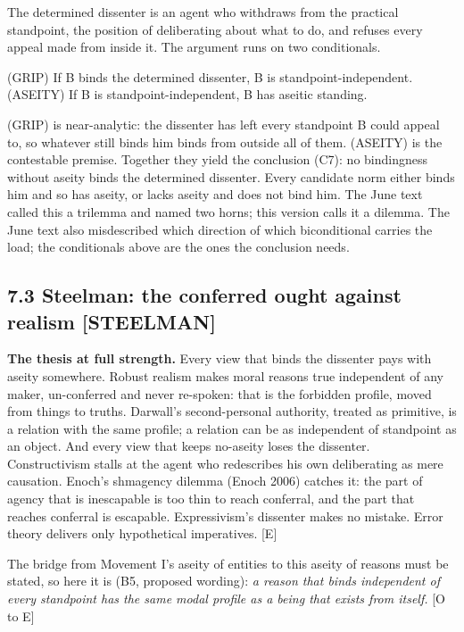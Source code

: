 \documentclass[11pt]{article}
\newcommand{\register}[1]{{\ttfamily\small #1}}
\begin{document}
The determined dissenter is an agent who withdraws from the practical standpoint, the position of deliberating about what to do, and refuses every appeal made from inside it. The argument runs on two conditionals.

(GRIP)    If B binds the determined dissenter, B is standpoint-independent. (ASEITY)  If B is standpoint-independent, B has aseitic standing.

(GRIP) is near-analytic: the dissenter has left every standpoint B could appeal to, so whatever still binds him binds from outside all of them. (ASEITY) is the contestable premise. Together they yield the conclusion (C7): no bindingness without aseity binds the determined dissenter. Every candidate norm either binds him and so has aseity, or lacks aseity and does not bind him. The June text called this a trilemma and named two horns; this version calls it a dilemma. The June text also misdescribed which direction of which biconditional carries the load; the conditionals above are the ones the conclusion needs.

\subsection*{7.3 Steelman: the conferred ought against realism \register{[STEELMAN]}}

\textbf{The thesis at full strength.} Every view that binds the dissenter pays with aseity somewhere. Robust realism makes moral reasons true independent of any maker, un-conferred and never re-spoken: that is the forbidden profile, moved from things to truths. Darwall's second-personal authority, treated as primitive, is a relation with the same profile; a relation can be as independent of standpoint as an object. And every view that keeps no-aseity loses the dissenter. Constructivism stalls at the agent who redescribes his own deliberating as mere causation. Enoch's shmagency dilemma (Enoch 2006) catches it: the part of agency that is inescapable is too thin to reach conferral, and the part that reaches conferral is escapable. Expressivism's dissenter makes no mistake. Error theory delivers only hypothetical imperatives. [E]

The bridge from Movement I's aseity of entities to this aseity of reasons must be stated, so here it is (B5, proposed wording): \emph{a reason that binds independent of every standpoint has the same modal profile as a being that exists from itself.} [O to E]
\end{document}

